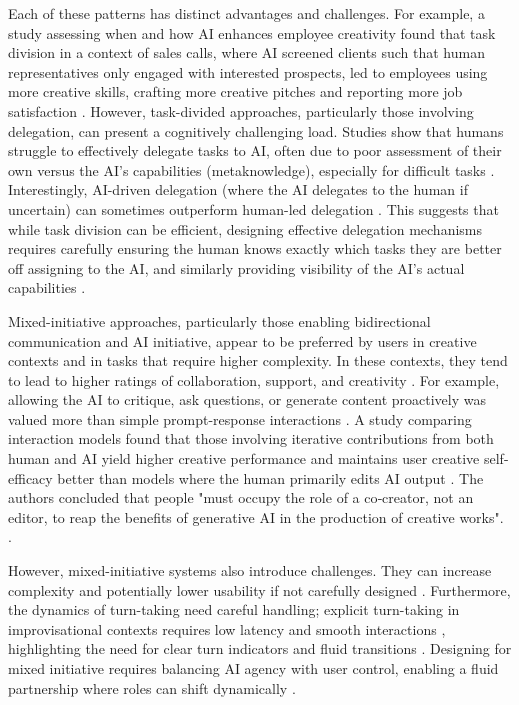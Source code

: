 Each of these patterns has distinct advantages and challenges. For example, a study assessing when and how AI enhances employee creativity found that task division in a context of sales calls, where AI screened clients such that human representatives only engaged with interested prospects, led to employees using more creative skills, crafting more creative pitches and reporting more job satisfaction \cite{Jia2024-vp}. However, task-divided approaches, particularly those involving delegation, can present a cognitively challenging load. Studies show that humans struggle to effectively delegate tasks to AI, often due to poor assessment of their own versus the AI's capabilities (metaknowledge), especially for difficult tasks \cite{Fugener2019-yz}. Interestingly, AI-driven delegation (where the AI delegates to the human if uncertain) can sometimes outperform human-led delegation \cite{Fugener2019-yz}. This suggests that while task division can be efficient, designing effective delegation mechanisms requires carefully ensuring the human knows exactly which tasks they are better off assigning to the AI, and similarly providing visibility of the AI's actual capabilities \cite{Dell-Acqua2022-dy, Fugener2019-yz}.

Mixed-initiative approaches, particularly those enabling bidirectional communication and AI initiative, appear to be preferred by users in creative contexts and in tasks that require higher complexity. In these contexts, they tend to lead to higher ratings of collaboration, support, and creativity \cite{Lin2023-jd}. For example, allowing the AI to critique, ask questions, or generate content proactively was valued more than simple prompt-response interactions \cite{Lin2023-jd}. A study comparing interaction models found that those involving iterative contributions from both human and AI yield higher creative performance and maintains user creative self-efficacy better than models where the human primarily edits AI output \cite{McGuire2024-im}. The authors concluded that people "must occupy the role of a co‑creator, not an editor, to reap the benefits of generative AI in the production of creative works". \cite{McGuire2024-im}.

However, mixed-initiative systems also introduce challenges. They can increase complexity and potentially lower usability if not carefully designed \cite{Lin2023-jd}. Furthermore, the dynamics of turn-taking need careful handling; explicit turn-taking in improvisational contexts requires low latency and smooth interactions \cite{Winston2017-nb}, highlighting the need for clear turn indicators and fluid transitions \cite{Shakeri2021-dx}. Designing for mixed initiative requires balancing AI agency with user control, enabling a fluid partnership where roles can shift dynamically \cite{Zhou2024-vp, Lawton2023-gd}.

